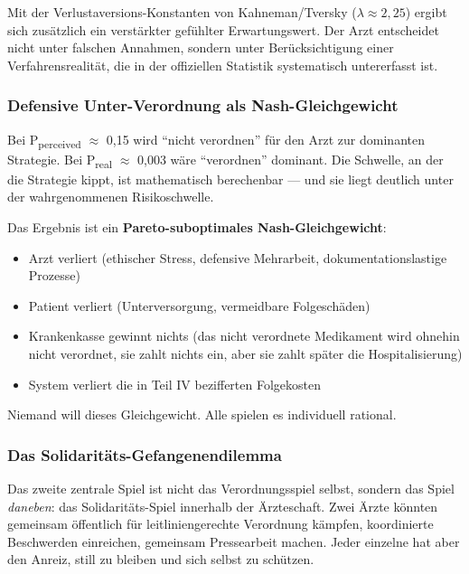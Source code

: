 \documentclass{umbruch-position}
\begin{document}
Mit der Verlustaversions-Konstanten von Kahneman/Tversky ($\lambda \approx 2{,}25$) ergibt sich zusätzlich ein verstärkter gefühlter Erwartungswert. Der Arzt entscheidet nicht unter falschen Annahmen, sondern unter Berücksichtigung einer Verfahrensrealität, die in der offiziellen Statistik systematisch untererfasst ist.

\subsubsection{Defensive Unter-Verordnung als Nash-Gleichgewicht}

Bei P\textsubscript{perceived} $\approx$ 0,15 wird ``nicht verordnen'' für den Arzt zur dominanten Strategie. Bei P\textsubscript{real} $\approx$ 0,003 wäre ``verordnen'' dominant. Die Schwelle, an der die Strategie kippt, ist mathematisch berechenbar — und sie liegt deutlich unter der wahrgenommenen Risikoschwelle.

Das Ergebnis ist ein \textbf{Pareto-suboptimales Nash-Gleichgewicht}:

\begin{itemize}[nosep]
  \item Arzt verliert (ethischer Stress, defensive Mehrarbeit, dokumentationslastige Prozesse)
  \item Patient verliert (Unterversorgung, vermeidbare Folgeschäden)
  \item Krankenkasse gewinnt nichts (das nicht verordnete Medikament wird ohnehin nicht verordnet, sie zahlt nichts ein, aber sie zahlt später die Hospitalisierung)
  \item System verliert die in Teil IV bezifferten Folgekosten
\end{itemize}

Niemand will dieses Gleichgewicht. Alle spielen es individuell rational.

\subsubsection{Das Solidaritäts-Gefangenendilemma}

Das zweite zentrale Spiel ist nicht das Verordnungsspiel selbst, sondern das Spiel \textit{daneben}: das Solidaritäts-Spiel innerhalb der Ärzteschaft. Zwei Ärzte könnten gemeinsam öffentlich für leitliniengerechte Verordnung kämpfen, koordinierte Beschwerden einreichen, gemeinsam Pressearbeit machen. Jeder einzelne hat aber den Anreiz, still zu bleiben und sich selbst zu schützen.
\end{document}
